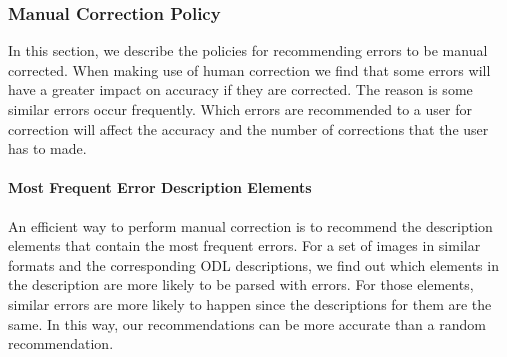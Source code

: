 \subsubsection{Manual Correction Policy}
In this section, we describe the policies for recommending 
errors to be manual corrected. When making use of human correction 
we find that some errors will have a greater impact on 
accuracy if they are corrected. The reason is some similar errors 
occur frequently. Which errors are recommended to a user 
for correction will affect the accuracy and the 
number of corrections that the user has to made. 
\paragraph{Most Frequent Error Description Elements}
An efficient way to perform manual correction is to 
recommend the description 
elements that contain the most frequent errors. For a set of images 
in similar formats and the corresponding ODL descriptions, 
we find out which elements in the description are more likely 
to be parsed with errors. For those elements, similar errors 
are more likely to happen since the descriptions for them are the 
same. In this way, our recommendations can be more 
accurate than 
a random recommendation. 

